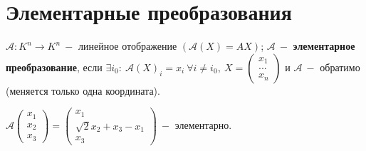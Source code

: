 \section{Элементарные преобразования}

\begin{definition}
    $\mathcal{A}:K^n\rightarrow K^n\ -$ линейное отображение 
$(\mathcal{A}(X)=AX)$; $\mathcal{A}\ -$ \textbf{элементарное 
преобразование}, если $\exists i_0:\ \mathcal{A}(X)_i=x_i\ \forall i\neq 
i_0,\ X=\begin{pmatrix}
    x_1 \\ ... \\ x_n
    \end{pmatrix}$ и $\mathcal{A}\ -$ обратимо (меняется только одна 
координата).
\end{definition}

\begin{example}
    $\mathcal{A}\begin{pmatrix}
        x_1 \\ x_2 \\ x_3
    \end{pmatrix}=\begin{pmatrix}
        x_1 \\ \sqrt{2}x_2 + x_3 - x_1 \\ x_3
    \end{pmatrix}\ -$ элементарно.
\end{example}

